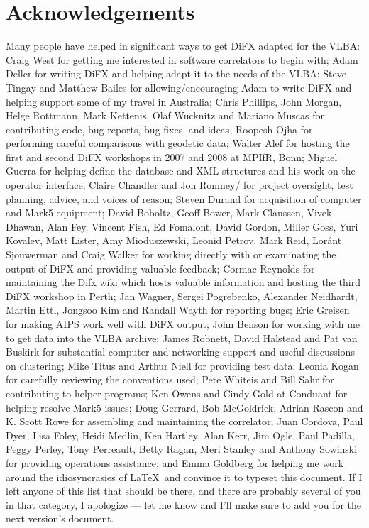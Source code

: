 \section{Acknowledgements}

Many people have helped in significant ways to get DiFX adapted for the VLBA:
Craig West for getting me interested in software correlators to begin with; 
Adam Deller for writing DiFX and helping adapt it to the needs of the VLBA; 
Steve Tingay and Matthew Bailes for allowing/encouraging Adam to write DiFX and helping support some of my travel in Australia;
Chris Phillips, John Morgan, Helge Rottmann, Mark Kettenis, Olaf Wucknitz and Mariano Muscas for contributing code, bug reports, bug fixes, and ideas;
Roopesh Ojha for performing careful comparisons with geodetic data;
Walter Alef for hosting the first and second DiFX workshops in 2007 and 2008 at MPIfR, Bonn;
Miguel Guerra for helping define the database and XML structures and his work on the operator interface;
Claire Chandler and Jon Romney/ for project oversight, test planning, advice, and voices of reason;
Steven Durand for acquisition of computer and Mark5 equipment;
David Boboltz, Geoff Bower, Mark Claussen, Vivek Dhawan, Alan Fey, Vincent Fish, Ed Fomalont, David Gordon, Miller Goss, Yuri Kovalev, Matt Lister, Amy Mioduszewski, Leonid Petrov, Mark Reid, Lor\'{a}nt Sjouwerman and Craig Walker for working directly with or examinating the output of DiFX and providing valuable feedback;
Cormac Reynolds for maintaining the Difx wiki which hosts valuable information and hosting the third DiFX workshop in Perth;
Jan Wagner, Sergei Pogrebenko, Alexander Neidhardt, Martin Ettl, Jongsoo Kim and Randall Wayth for reporting bugs;
Eric Greisen for making AIPS work well with DiFX output;
John Benson for working with me to get data into the VLBA archive;
James Robnett, David Halstead and Pat van Buskirk for substantial computer and networking support and useful discussions on clustering;
Mike Titus and Arthur Niell for providing test data;
Leonia Kogan for carefully reviewing the conventions used;
Pete Whiteis and Bill Sahr for contributing to helper programs;
Ken Owens and Cindy Gold at Conduant for helping resolve Mark5 issues;
Doug Gerrard, Bob McGoldrick, Adrian Rascon and K. Scott Rowe for assembling and maintaining the correlator;
Juan Cordova, Paul Dyer, Lisa Foley, Heidi Medlin, Ken Hartley, Alan Kerr, Jim Ogle, Paul Padilla, Peggy Perley, Tony Perreault, Betty Ragan, Meri Stanley and Anthony Sowinski for providing operations assistance;
and
Emma Goldberg for helping me work around the idiosyncrasies of \LaTeX \ and convince it to typeset this document.
If I left anyone of this list that should be there, and there are probably several of you in that category, I apologize --- let me know and I'll make sure to add you for the next version's document.


